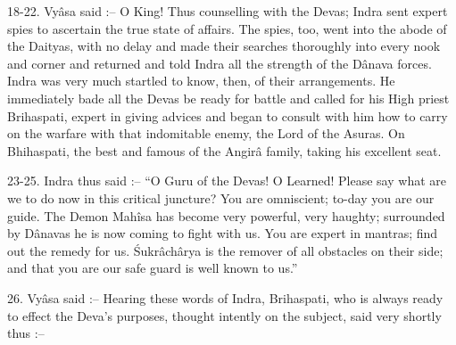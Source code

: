 18-22. Vy\^asa said :-- O King! Thus counselling with the Devas; Indra sent expert spies to ascertain the true state of affairs. The spies, too, went into the abode of the Daityas, with no delay and made their searches thoroughly into every nook and corner and returned and told Indra all the strength of the D\^anava forces. Indra was very much startled to know, then, of their arrangements. He immediately bade all the Devas be ready for battle and called for his High priest Brihaspati, expert in giving advices and began to consult with him how to carry on the warfare with that indomitable enemy, the Lord of the Asuras. On Bhihaspati, the best and famous of the Angir\^a family, taking his excellent seat.

23-25. Indra thus said :-- ``O Guru of the Devas! O Learned! Please say what are we to do now in this critical juncture? You are omniscient; to-day you are our guide. The Demon Mah\^isa has become very powerful, very haughty; surrounded by D\^anavas he is now coming to fight with us. You are expert in mantras; find out the remedy for us. \'Sukr\^ach\^arya is the remover of all obstacles on their side; and that you are our safe guard is well known to us.''

26. Vy\^asa said :-- Hearing these words of Indra, Brihaspati, who is always ready to effect the Deva's purposes, thought intently on the subject, said very shortly thus :--

